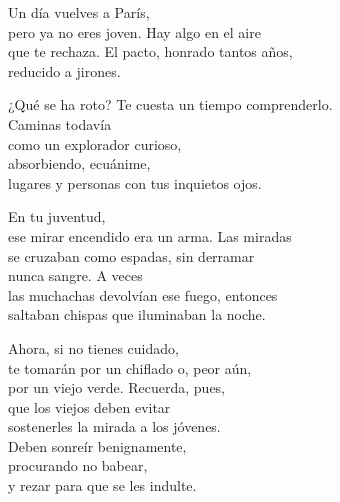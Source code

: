 \documentclass[12pt,twoside]{article}
\begin{document}
\begin{poem}
\begin{stanza}
Un día vuelves a París,\\
pero ya no eres joven. Hay algo en el aire\\
que te rechaza. El pacto, honrado tantos años,\\
reducido a jirones.
\end{stanza}
\begin{stanza}
¿Qué se ha roto? Te cuesta un tiempo comprenderlo.\\
Caminas todavía\\
como un explorador curioso,\\
absorbiendo, ecuánime,\\
lugares y personas con tus inquietos ojos.
\end{stanza}
\begin{stanza}
En tu juventud,\\
ese mirar encendido era un arma. Las miradas\\
se cruzaban como espadas, sin derramar\\
nunca sangre. A veces \\
las muchachas devolvían ese fuego, entonces\\
saltaban chispas que iluminaban la noche.
\end{stanza}
\begin{stanza}
Ahora, si no tienes cuidado,\\
te tomarán por un chiflado o, peor aún,\\
por un viejo verde. Recuerda, pues,\\
que los viejos deben evitar\\
sostenerles la mirada a los jóvenes.\\
Deben sonreír benignamente,\\
procurando no babear,\\
y rezar para que se les indulte.
\end{stanza}
\end{poem}
\end{document}
